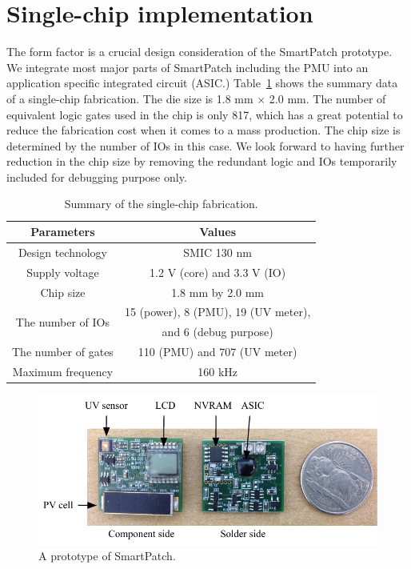 \documentclass[journal]{IEEEtran}
\begin{document}
\section{Single-chip implementation}

The form factor is a crucial design consideration of the SmartPatch prototype.
We integrate most major parts of SmartPatch including the PMU into an application specific integrated circuit (ASIC.)
Table~\ref{table:fab_summary} shows the summary data of a single-chip fabrication.
The die size is 1.8 mm $\times$ 2.0 mm.
The number of equivalent logic gates used in the chip is only 817, which has a great potential to reduce the fabrication cost when it comes to a mass production.
The chip size is determined by the number of IOs in this case.
We look forward to having further reduction in the chip size by removing the redundant logic and IOs temporarily included for debugging purpose only.

\begin{table}
\centering
\caption{Summary of the single-chip fabrication.}
\label{table:fab_summary}
\begin{tabular}{|c|c|}  \hline
Parameters			&Values	\\ \hline \hline
Design technology		&SMIC 130 nm  \\ \hline
Supply voltage		&1.2 V (core) and 3.3 V (IO) \\ \hline
Chip size				&1.8 mm by 2.0 mm \\ \hline
\multirow{2}{*}{The number of IOs}		&15 (power), 8 (PMU), 19 (UV meter), \\
					&and 6 (debug purpose) \\ \hline		
The number of gates	&110 (PMU) and 707 (UV meter) \\ \hline
Maximum frequency	&160 kHz \\ \hline		
\end{tabular}
\end{table}

\begin{figure}
\centering
\includegraphics[width=1.0\hsize]{Figures/prototype.pdf}
\caption{A prototype of SmartPatch.}
\label{fig:prototype}
\end{figure}
\end{document}
